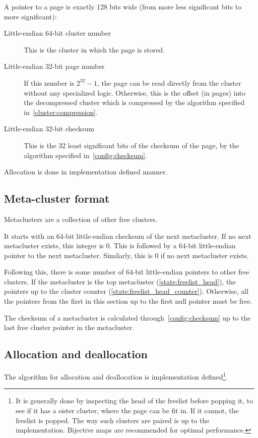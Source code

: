 \documentclass[11pt,a4paper]{report}
\begin{document}
        A pointer to a page is exactly 128 bits wide (from more less
        significant bits to more significant):

        \begin{description}
            \item [Little-endian 64-bit cluster number] This is the cluster in
                which the page is stored.
            \item [Little-endian 32-bit page number] If this number is $2^{32}
                - 1$, the page can be read directly from the cluster without
                any specialized logic.  Otherwise, this is the offset (in
                pages) into the decompressed cluster which is compressed by the
                algorithm specified in~\ref{cluster:compression}.
            \item [Little-endian 32-bit checksum] This is the 32 least
                significant bits of the checksum of the page, by the algorithm
                specified in~\ref{config:checksum}.
        \end{description}

        Allocation is done in implementation defined manner.

        \subsection{Meta-cluster format}
        \label{cluster:metacluster}
        Metaclusters are a collection of other free clusters.

        It starts with an 64-bit little-endian checksum of the next
        metacluster. If no next metacluster exists, this integer is 0. This is
        followed by a 64-bit little-endian pointer to the next metacluster.
        Similarly, this is 0 if no next metacluster exists.

        Following this, there is some number of 64-bit little-endian pointers
        to other free clusters. If the metacluster is the top metacluster
        (\ref{state:freelist_head}), the pointers up to the cluster counter
        (\ref{state:freelist_head_counter}). Otherwise, all the pointers from
        the first in this section up to the first null pointer must be free.

        The checksum of a metacluster is calculated
        through~\ref{config:checksum} up to the last free cluster pointer in
        the metacluster.

        \subsection{Allocation and deallocation}
        The algorithm for allocation and deallocation is implementation
        defined\footnote{It is generally done by inspecting the head of the
        freelist before popping it, to see if it has a sister cluster,
        where the page can be fit in. If it cannot, the freelist is popped.
        The way such clusters are paired is up to the implementation.
        Bijective maps are recommended for optimal performance.}.
\end{document}
